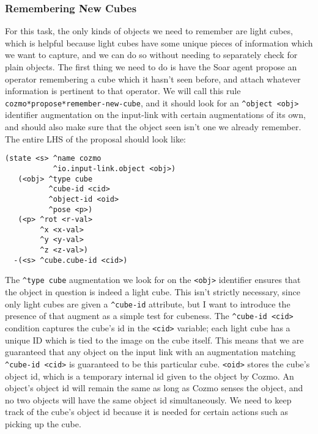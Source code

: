 \hypertarget{remembering-new-cubes}{%
\subsubsection{Remembering New Cubes}\label{remembering-new-cubes}}

For this task, the only kinds of objects we need to remember are light
cubes, which is helpful because light cubes have some unique pieces of
information which we want to capture, and we can do so without needing
to separately check for plain objects. The first thing we need to do is
have the Soar agent propose an operator remembering a cube which it
hasn't seen before, and attach whatever information is pertinent to that
operator. We will call this rule
\texttt{cozmo*propose*remember-new-cube}, and it should look for an
\texttt{\^{}object\ \textless{}obj\textgreater{}} identifier
augmentation on the input-link with certain augmentations of its own,
and should also make sure that the object seen isn't one we already
remember. The entire LHS of the proposal should look like:

\begin{verbatim}
(state <s> ^name cozmo
           ^io.input-link.object <obj>)
   (<obj> ^type cube
          ^cube-id <cid>
          ^object-id <oid>
          ^pose <p>)
   (<p> ^rot <r-val>
        ^x <x-val>
        ^y <y-val>
        ^z <z-val>)
  -(<s> ^cube.cube-id <cid>)
\end{verbatim}

The \texttt{\^{}type\ cube} augmentation we look for on the
\texttt{\textless{}obj\textgreater{}} identifier ensures that the object
in question is indeed a light cube. This isn't strictly necessary, since
only light cubes are given a \texttt{\^{}cube-id} attribute, but I want
to introduce the presence of that augment as a simple test for cubeness.
The \texttt{\^{}cube-id\ \textless{}cid\textgreater{}} condition
captures the cube's id in the \texttt{\textless{}cid\textgreater{}}
variable; each light cube has a unique ID which is tied to the image on
the cube itself. This means that we are guaranteed that any object on
the input link with an augmentation matching
\texttt{\^{}cube-id\ \textless{}cid\textgreater{}} is guaranteed to be
this particular cube. \texttt{\textless{}oid\textgreater{}} stores the
cube's object id, which is a temporary internal id given to the object
by Cozmo. An object's object id will remain the same as long as Cozmo
senses the object, and no two objects will have the same object id
simultaneously. We need to keep track of the cube's object id because it
is needed for certain actions such as picking up the cube.

